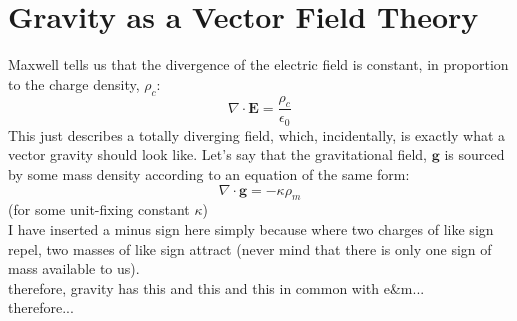 \documentclass[11pt]{article}
\begin{document}
\section{Gravity as a Vector Field Theory}
Maxwell tells us that the divergence of the electric field is constant, in proportion to the charge density, $\rho_c$:
\begin{equation}
\nabla \cdot \mathbf{E} = \frac{\rho_c}{\epsilon_0}
\end{equation}
This just describes a totally diverging field, which, incidentally, is exactly what a vector gravity should look like.  Let's say that the gravitational field, $\mathbf{g}$ is sourced by some mass density according to an equation of the same form:
\begin{equation}
\nabla \cdot \mathbf{g} = -\kappa \rho_m
\end{equation}
(for some unit-fixing constant $\kappa$)\\
I have inserted a minus sign here simply because where two charges of like sign repel, two masses of like sign attract (never mind that there is only one sign of mass available to us).\\
therefore, gravity has this and this and this in common with e\&m...\\
therefore...\\
\begin{center}
\end{center}
\end{document}
